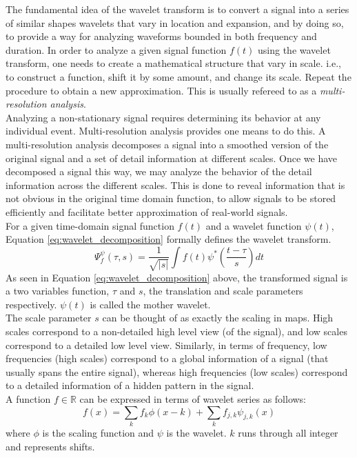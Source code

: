 The fundamental idea of the wavelet transform is to convert a signal into a series of similar shapes wavelets that vary in location and expansion, and by doing so, to provide a way for analyzing waveforms bounded in both frequency and duration. 
In order to analyze a given signal function $f(t)$ using the wavelet transform, one needs to create a mathematical structure that vary in scale. i.e., to construct a function, shift it by some amount, and change its scale. Repeat the procedure to obtain a new approximation. This is usually refereed to as a \emph{multi-resolution analysis}.\\ 

Analyzing a non-stationary signal requires determining its behavior at any individual event. Multi-resolution analysis provides one means to do this. A multi-resolution analysis decomposes a signal into a smoothed version of the original signal and a set of detail information at different scales. Once we have decomposed a signal this way, we may analyze the behavior of the detail information across the different scales. This is done to reveal information that is not obvious in the original time domain function, to allow signals to be stored efficiently and facilitate better approximation of real-world signals. \\

For a given time-domain signal function $f(t)$ and a wavelet function $\psi(t)$, Equation \ref{eq:wavelet_decomposition} formally defines the wavelet transform.
\begin{equation}
\Psi^{\psi}_{f}(\tau, s)=\frac{1}{\sqrt{|s|}}\int{f(t)\psi^*(\frac{t-\tau}{s})dt}
\label{eq:wavelet_decomposition}
\end{equation}
As seen in Equation \ref{eq:wavelet_decomposition} above, the transformed signal is a two variables function, $\tau$ and $s$, the translation and scale parameters respectively. $\psi(t)$ is called the mother wavelet.\\

The scale parameter $s$ can be thought of as exactly the scaling in maps. High scales correspond to a non-detailed high level view (of the signal), and low scales correspond to a detailed low level view. Similarly, in terms of frequency, low frequencies (high scales) correspond to a global information of a signal (that usually spans the entire signal), whereas high frequencies (low scales) correspond to a detailed information of a hidden pattern in the signal.\\

A function $f \in \mathbb{R}$ can be expressed in terms of wavelet series as follows:
\begin{equation}
f(x)=\sum\limits_{k}{f_k \phi(x-k)}+\sum\limits_{k}{f_{j,k}\psi_{j,k}(x)}
\end{equation}
where $\phi$ is the scaling function and $\psi$ is the wavelet. $k$ runs through all integer and represents shifts.\\

%
%
%
%
